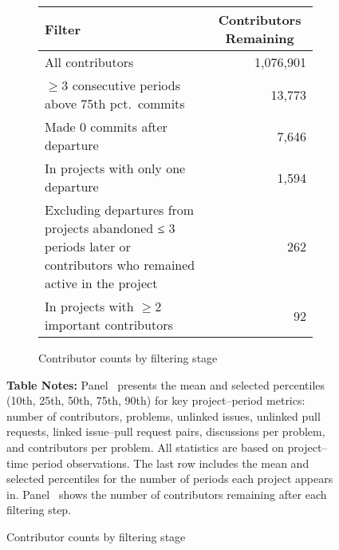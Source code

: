 \begin{figure}[ht]
  \begin{subfigure}[b]{0.9\textwidth}
\caption{Contributor counts by filtering stage} \label{fig:departed-summary-stats}
    \centering
    \small
    \begin{tabular}{@{}p{} r@{}}
      \toprule
      Filter & \multicolumn{1}{c}{Contributors Remaining} \\
      \midrule
      All contributors                                    & 1,076,901 \\
      $\ge 3$ consecutive periods above 75th pct.\ commits &   13,773   \\
      Made 0 commits after departure                      &    7,646   \\
      In projects with only one departure                 &    1,594   \\
      Excluding departures from projects abandoned ≤ 3 periods later or contributors who remained active in the project &    262   \\
      In projects with $\ge 2$ important contributors     &       92   \\
      \bottomrule
    \end{tabular}
  \end{subfigure}
    \bigskip
  \vspace{1ex}
  \begin{minipage}{0.9\textwidth}
    \small
    \textbf{Table Notes:}
    Panel~ presents the mean and selected percentiles (10th, 25th, 50th, 75th, 90th) for key project–period metrics: number of contributors, problems, unlinked issues, unlinked pull requests, linked issue–pull request pairs, discussions per problem, and contributors per problem. All statistics are based on project–time period observations. The last row includes the mean and selected percentiles for the number of periods each project appears in. 
    Panel~ shows the number of contributors remaining after each filtering step.
  \end{minipage}


\end{figure}
\pagebreak
